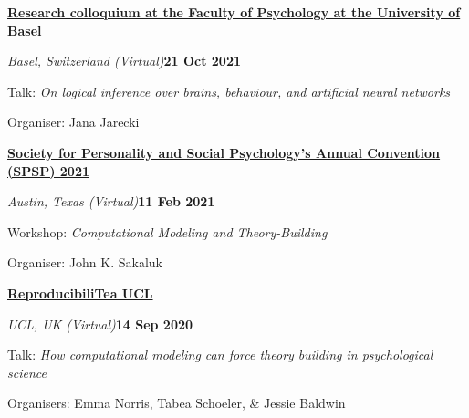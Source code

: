 \documentclass[10pt]{article}
\newenvironment{outerlist}[1][\enskip\textbullet]%
        {\begin{itemize}[#1]}{\end{itemize}%
         \vspace{-.6\baselineskip}}
\newenvironment{innerlist}[1][\enskip\textbullet]%
        {\begin{compactitem}[#1]}{\end{compactitem}}
\begin{document}
\textbf{\href{https://www.ru.nl/nsm/imr/research-facilities/research-centres/vm/rucam-ssh/}{Research colloquium at the Faculty of Psychology at the University of Basel}}
\begin{outerlist}
  \item[] \textit{Basel, Switzerland (Virtual)}\hfill\textbf{21 Oct 2021}
  \begin{innerlist}
    \item Talk: \textit{On logical inference over brains, behaviour, and artificial neural networks}
    \item Organiser: Jana Jarecki
  \end{innerlist}
\end{outerlist}
\vspace{8pt}

\textbf{\href{https://meeting.spsp.org/2021/programming/full-schedule}{Society for Personality and Social Psychology’s Annual Convention (SPSP) 2021}} 
\begin{outerlist}
  \item[] \textit{Austin, Texas (Virtual)}\hfill\textbf{11 Feb 2021}
  \begin{innerlist}
    \item Workshop: \textit{Computational Modeling and Theory-Building}
    \item Organiser: John K. Sakaluk
  \end{innerlist}
\end{outerlist}
\vspace{8pt}


\textbf{\href{https://www.eventbrite.co.uk/o/reproducibilitea-ucl-19116673509}{ReproducibiliTea UCL}} 
\begin{outerlist}
  \item[] \textit{UCL, UK (Virtual)}\hfill\textbf{14 Sep 2020}
  \begin{innerlist}
    \item Talk: \textit{How computational modeling can force theory building in psychological science}
    \item Organisers: Emma Norris, Tabea Schoeler, \&  Jessie Baldwin
  \end{innerlist}
\end{outerlist}
\vspace{20pt}
\end{document}
